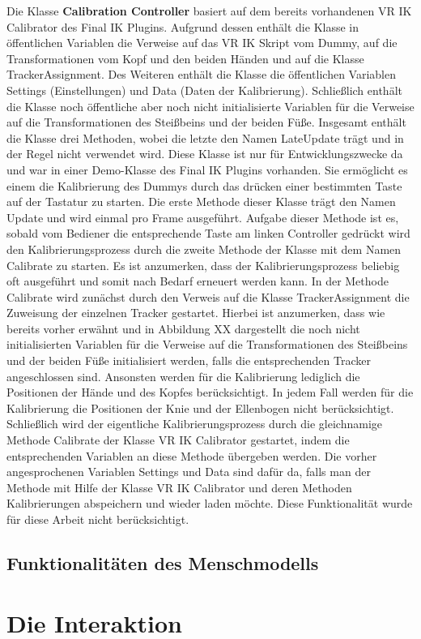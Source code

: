 \newline\newline
Die Klasse \textbf{Calibration Controller} basiert auf dem bereits vorhandenen VR IK Calibrator des Final IK Plugins. Aufgrund dessen enthält die Klasse in öffentlichen Variablen die Verweise auf das VR IK Skript vom Dummy, auf die Transformationen vom Kopf und den beiden Händen und auf die Klasse TrackerAssignment. Des Weiteren enthält die Klasse die öffentlichen Variablen Settings (Einstellungen) und Data (Daten der Kalibrierung). Schließlich enthält die Klasse noch öffentliche aber noch nicht initialisierte Variablen für die Verweise auf die Transformationen des Steißbeins und der beiden Füße.
\newline
Insgesamt enthält die Klasse drei Methoden, wobei die letzte den Namen LateUpdate trägt und in der Regel nicht verwendet wird. Diese Klasse ist nur für Entwicklungszwecke da und war in einer Demo-Klasse des Final IK Plugins vorhanden. Sie ermöglicht es einem die Kalibrierung des Dummys durch das drücken einer bestimmten Taste auf der Tastatur zu starten. Die erste Methode dieser Klasse trägt den Namen Update und wird einmal pro Frame ausgeführt. Aufgabe dieser Methode ist es, sobald vom Bediener die entsprechende Taste am linken Controller gedrückt wird den Kalibrierungsprozess durch die zweite Methode der Klasse mit dem Namen Calibrate zu starten. Es ist anzumerken, dass der Kalibrierungsprozess beliebig oft ausgeführt und somit nach Bedarf erneuert werden kann.
\newline
In der Methode Calibrate wird zunächst durch den Verweis auf die Klasse TrackerAssignment die Zuweisung der einzelnen Tracker gestartet. Hierbei ist anzumerken, dass wie bereits vorher erwähnt und in Abbildung XX dargestellt die noch nicht initialisierten Variablen für die Verweise auf die Transformationen des Steißbeins und der beiden Füße initialisiert werden, falls die entsprechenden Tracker angeschlossen sind. Ansonsten werden für die Kalibrierung lediglich die Positionen der Hände und des Kopfes berücksichtigt. In jedem Fall werden für die Kalibrierung die Positionen der Knie und der Ellenbogen nicht berücksichtigt.
\newline
Schließlich wird der eigentliche Kalibrierungsprozess durch die gleichnamige Methode Calibrate der Klasse VR IK Calibrator gestartet, indem die entsprechenden Variablen an diese Methode übergeben werden. Die vorher angesprochenen Variablen Settings und Data sind dafür da, falls man der Methode mit Hilfe der Klasse VR IK Calibrator und deren Methoden Kalibrierungen abspeichern und wieder laden möchte. Diese Funktionalität wurde für diese Arbeit nicht berücksichtigt.




\subsection{Funktionalitäten des Menschmodells}\label{sec:MMFunktionen}
\section{Die Interaktion}\label{sec:DieInteraktion}



